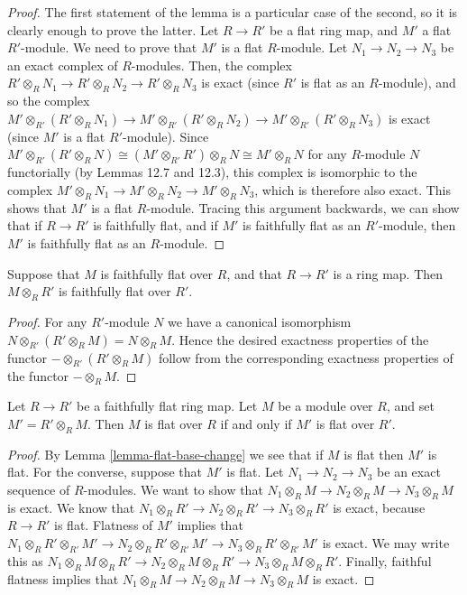 \begin{proof}
	The first statement of the lemma is a particular case of the
	second, so it is clearly enough to prove the latter. Let
	$R \to R'$ be a flat ring map, and $M'$ a flat $R'$-module.
	We need to prove that $M'$ is a flat $R$-module. Let
	$N_1 \to N_2 \to N_3$ be an exact complex of $R$-modules.
	Then, the complex $R' \otimes_R N_1 \to
	R' \otimes_R N_2 \to R' \otimes_R N_3$ is exact (since $R'$
	is flat as an $R$-module), and so the complex
	$M' \otimes_{R'} \left(R' \otimes_R N_1\right)
	\to M' \otimes_{R'} \left(R' \otimes_R N_2\right)
	\to M' \otimes_{R'} \left(R' \otimes_R N_3\right)$ is
	exact (since $M'$ is a flat $R'$-module). Since
	$M' \otimes_{R'} \left(R' \otimes_R N\right)
	\cong \left(M' \otimes_{R'} R'\right) \otimes_R N
	\cong M' \otimes_R N$ for any $R$-module $N$ functorially
	(by Lemmas 12.7 and
	12.3), this complex is isomorphic
	to the complex
	$M' \otimes_R N_1 \to M' \otimes_R N_2 \to M' \otimes_R N_3$,
	which is therefore also exact. This shows that $M'$ is a flat
	$R$-module. Tracing this argument backwards, we can show
	that if $R \to R'$ is faithfully flat, and if $M'$ is
	faithfully flat as an $R'$-module, then $M'$ is faithfully
	flat as an $R$-module.
\end{proof}

\begin{lemma}
	\label{lemma-flat-base-change}
	Suppose that $M$ is faithfully flat over $R$, and that $R \to R'$
	is a ring map. Then $M \otimes_R R'$ is faithfully flat over $R'$.
\end{lemma}

\begin{proof}
	For any $R'$-module $N$ we have a canonical
	isomorphism $N \otimes_{R'} (R'\otimes_R M)
	= N \otimes_R M$. Hence the desired exactness properties of the functor
	$-\otimes_{R'}(R'\otimes_R M)$ follow from
	the corresponding exactness properties of the functor $-\otimes_R M$.
\end{proof}

\begin{lemma}
	\label{lemma-flatness-descends}
	Let $R \to R'$ be a faithfully flat ring map.
	Let $M$ be a module over $R$, and set $M' = R' \otimes_R M$.
	Then $M$ is flat over $R$ if and only if $M'$ is flat over $R'$.
\end{lemma}

\begin{proof}
	By Lemma \ref{lemma-flat-base-change} we see that if $M$ is flat
	then $M'$ is flat. For the converse, suppose that $M'$ is flat.
	Let $N_1 \to N_2 \to N_3$ be an exact sequence of $R$-modules.
	We want to show that $N_1 \otimes_R M \to N_2 \otimes_R M \to N_3 \otimes_R M$
	is exact. We know that
	$N_1 \otimes_R R' \to N_2 \otimes_R R' \to N_3 \otimes_R R'$ is
	exact, because $R \to R'$ is flat. Flatness of $M'$ implies that
	$N_1 \otimes_R R' \otimes_{R'} M'
	\to N_2 \otimes_R R' \otimes_{R'} M'
	\to N_3 \otimes_R R' \otimes_{R'} M'$ is exact.
	We may write this as
	$N_1 \otimes_R M \otimes_R R'
	\to N_2 \otimes_R M \otimes_R R'
	\to N_3 \otimes_R M \otimes_R R'$.
	Finally, faithful flatness implies that
	$N_1 \otimes_R M \to N_2 \otimes_R M \to N_3 \otimes_R M$
	is exact.
\end{proof}

